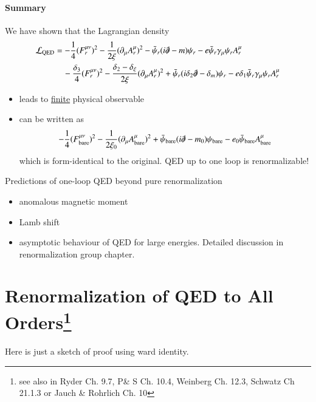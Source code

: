 \paragraph{Summary}
We have shown that the Lagrangian density
\begin{align*}
   \mathcal{L}_{\text{QED}} &= - \frac{1}{4} (F_r^{\mu\nu})^2 - \frac{1}{2\xi} (\partial_\mu A_r^\mu)^2 - \bar\psi_r (i \slashed{\partial} - m) \psi_r - e \bar\psi_r \gamma_\mu \psi_r A_r^\mu \\
   &\quad- \frac{\delta_3}{4} (F_r^{\mu\nu})^2 - \frac{\delta_2 - \delta_\xi}{2 \xi} (\partial_\mu A^\mu_r)^2 + \bar\psi_r (i\delta_2 \slashed{\partial} - \delta_m) \psi_r - e \delta_1 \bar\psi_r \gamma_\mu \psi_r A_r^\mu 
\end{align*}
\begin{itemize}
   \item leads to \underline{finite} physical observable 
   \item can be written as
      \begin{align}
         -\frac{1}{4} (F_\text{bare}^{\mu\nu})^2 - \frac{1}{2\xi_0} (\partial_\mu A^\mu_\text{bare})^2 + \bar\psi_{\text{bare}} (i \slashed{\partial} - m_0) \psi_{\text{bare}} - e_0 \bar\psi_{\text{bare}} A^\mu_\text{bare}
      \end{align}
      which is form-identical to the original. QED up to one loop is renormalizable!
\end{itemize}

Predictions of one-loop QED beyond pure renormalization
\begin{itemize}
   \item anomalous magnetic moment 
   \item Lamb shift
   \item asymptotic behaviour of QED for large energies. Detailed discussion in renormalization group chapter.
\end{itemize}


\section[Renormalization of QED to All Orders]{Renormalization of QED to All Orders\footnote{see also in Ryder Ch. 9.7, P\& S Ch. 10.4, Weinberg  Ch. 12.3, Schwatz Ch 21.1.3 or Jauch \& Rohrlich Ch. 10}}
Here is just a sketch of proof using ward identity.

